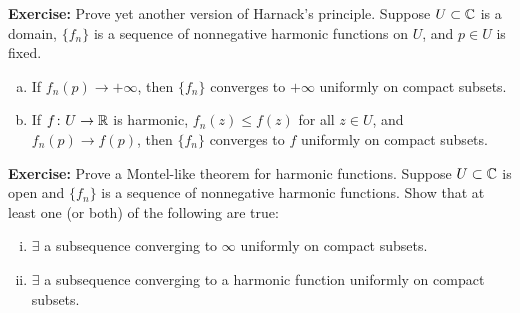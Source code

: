 \documentclass[10pt,aspectratio=169]{beamer}
\begin{document}
\begin{frame}
\textbf{Exercise:}
Prove yet another version of Harnack's principle.
Suppose $U \subset {\mathbb{C}}$ is a domain,
$\{ f_n \}$ is a sequence of nonnegative harmonic functions on
$U$, and $p \in U$ is fixed.
\begin{enumerate}[a)]
\item
If $f_n(p) \to +\infty$, then $\{ f_n \}$ converges to $+\infty$ uniformly on
compact subsets.
\item
If $f \colon U \to {\mathbb{R}}$ is harmonic, $f_n(z) \leq f(z)$ for all $z \in U$,
and $f_n(p) \to f(p)$, then $\{ f_n \}$ converges to $f$ uniformly on
compact subsets.
\end{enumerate}

\medskip
\pause

\textbf{Exercise:}
Prove a Montel-like theorem for harmonic functions.  Suppose $U \subset {\mathbb{C}}$
is open and $\{ f_n \}$ is a sequence of nonnegative harmonic functions.
Show that at least one (or both) of the following are true:
\begin{enumerate}[(i)]
\item
$\exists$ a subsequence converging to $\infty$ uniformly on compact subsets.
\item
$\exists$ a subsequence converging to a harmonic function
uniformly on compact subsets.
\end{enumerate}

\end{frame}
\end{document}
